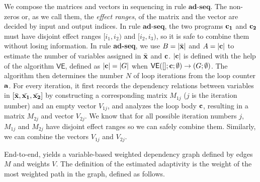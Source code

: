 We compose the matrices and vectors in sequencing in rule $\textbf{ad-seq}$. The non-zeros or, as we call them, the \emph{effect ranges}, of the matrix and the vector are decided by input and output indices. In rule $\textbf{ad-seq}$, the two programs ${\bf{{c_1}}}$ and ${\bf{{c_2}}}$ must have disjoint effect ranges $[i_1, i_2)$ and $[i_2,i_3)$, so it is safe to combine them without losing information. 
In rule \textbf{ad-seq}, we use $B= |\bar{{\bf{{x}}}}|$ and $A= |{{\bf{{c}}}}|$ to estimate the number of variables assigned in $\bar{{\bf{{x}}}}$ and ${\bf{{c}}}$. $|{\bf{{c}}}|$ is defined with the help of the algorithm $\mathsf{VE}$, defined as $|{\bf{{c}}}|= |G|$ when $\mathsf{VE}{([];{\bf{{c}}};\emptyset )}\to {( G; \emptyset )}$. The algorithm then determines the number $N$ of loop iterations from the loop counter ${\bf{{a}}}$. For every iteration, it first records the dependency relations between variables in $ [\bar{{\bf{{x}}}}, \bar{{\bf{{x_1}}}}, \bar{{\bf{{x_2}}}}]$ by constructing a corresponding matrix $M_{1j}$ ($j$ is the iteration number) and an empty vector $V_{1j}$, and analyzes the loop body ${\bf{{c}}}$, resulting in a matrix $M_{2j}$ and vector $V_{2j}$. We know that for all possible iteration numbers $j$, $M_{1j}$ and $M_{2j}$ have disjoint effect ranges so we can safely combine them. Similarly, we can combine the vectors $V_{1j}$ and $V_{2j}$.   

End-to-end, {\THESYSTEM} yields a variable-based weighted dependency graph defined by edges $M$ and weights $V$. The definition of the estimated adaptivity is the weight of the most weighted path in the graph, defined as follows. 

